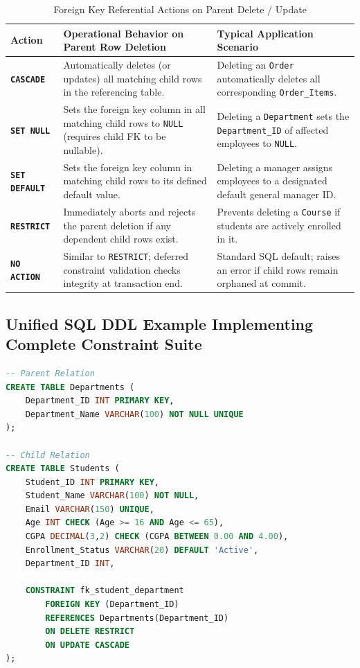 \begin{table}[htbp]
\centering
\caption{Foreign Key Referential Actions on Parent Delete / Update}
\label{tab:foreign_key_actions}
\begin{tabularx}{\textwidth}{l X X}
\toprule
\textbf{Action} & \textbf{Operational Behavior on Parent Row Deletion} & \textbf{Typical Application Scenario} \\
\midrule
\textbf{\texttt{CASCADE}} & Automatically deletes (or updates) all matching child rows in the referencing table. & Deleting an \texttt{Order} automatically deletes all corresponding \texttt{Order\_Items}. \\
\textbf{\texttt{SET NULL}} & Sets the foreign key column in all matching child rows to \texttt{NULL} (requires child FK to be nullable). & Deleting a \texttt{Department} sets the \texttt{Department\_ID} of affected employees to \texttt{NULL}. \\
\textbf{\texttt{SET DEFAULT}} & Sets the foreign key column in matching child rows to its defined default value. & Deleting a manager assigns employees to a designated default general manager ID. \\
\textbf{\texttt{RESTRICT}} & Immediately aborts and rejects the parent deletion if any dependent child rows exist. & Prevents deleting a \texttt{Course} if students are actively enrolled in it. \\
\textbf{\texttt{NO ACTION}} & Similar to \texttt{RESTRICT}; deferred constraint validation checks integrity at transaction end. & Standard SQL default; raises an error if child rows remain orphaned at commit. \\
\bottomrule
\end{tabularx}
\end{table}

\subsection{Unified SQL DDL Example Implementing Complete Constraint Suite}

\begin{lstlisting}[language=SQL,caption={Production SQL DDL Incorporating All Six Constraint Classes}]
-- Parent Relation
CREATE TABLE Departments (
    Department_ID INT PRIMARY KEY,
    Department_Name VARCHAR(100) NOT NULL UNIQUE
);

-- Child Relation
CREATE TABLE Students (
    Student_ID INT PRIMARY KEY,
    Student_Name VARCHAR(100) NOT NULL,
    Email VARCHAR(150) UNIQUE,
    Age INT CHECK (Age >= 16 AND Age <= 65),
    CGPA DECIMAL(3,2) CHECK (CGPA BETWEEN 0.00 AND 4.00),
    Enrollment_Status VARCHAR(20) DEFAULT 'Active',
    Department_ID INT,
    
    CONSTRAINT fk_student_department
        FOREIGN KEY (Department_ID)
        REFERENCES Departments(Department_ID)
        ON DELETE RESTRICT
        ON UPDATE CASCADE
);
\end{lstlisting}

